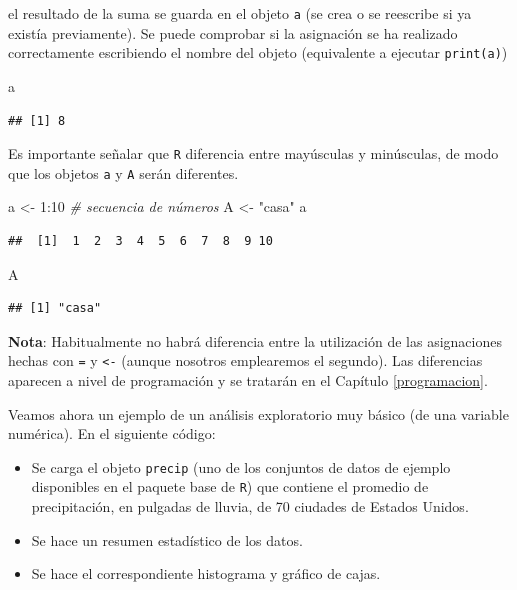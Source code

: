 \documentclass[
]{book}
\newenvironment{Shaded}{\begin{snugshade}}{\end{snugshade}}
\newcommand{\CommentTok}[1]{\textcolor[rgb]{0.56,0.35,0.01}{\textit{#1}}}
\newcommand{\DecValTok}[1]{\textcolor[rgb]{0.00,0.00,0.81}{#1}}
\newcommand{\NormalTok}[1]{#1}
\newcommand{\OtherTok}[1]{\textcolor[rgb]{0.56,0.35,0.01}{#1}}
\newcommand{\SpecialCharTok}[1]{\textcolor[rgb]{0.00,0.00,0.00}{#1}}
\newcommand{\StringTok}[1]{\textcolor[rgb]{0.31,0.60,0.02}{#1}}
\theoremstyle{break}
\theoremstyle{nonumberplain}
\begin{document}
el resultado de la suma se guarda en el objeto \texttt{a} (se crea o se reescribe si ya existía previamente).
Se puede comprobar si la asignación se ha realizado correctamente escribiendo el nombre del objeto (equivalente a ejecutar \texttt{print(a)})

\begin{Shaded}
\begin{Highlighting}[]
\NormalTok{a}
\end{Highlighting}
\end{Shaded}

\begin{verbatim}
## [1] 8
\end{verbatim}

Es importante señalar que \texttt{R} diferencia entre mayúsculas y
minúsculas, de modo que los objetos \texttt{a} y \texttt{A} serán diferentes.

\begin{Shaded}
\begin{Highlighting}[]
\NormalTok{a }\OtherTok{\textless{}{-}} \DecValTok{1}\SpecialCharTok{:}\DecValTok{10} \CommentTok{\# secuencia de números}
\NormalTok{A }\OtherTok{\textless{}{-}} \StringTok{"casa"}
\NormalTok{a}
\end{Highlighting}
\end{Shaded}

\begin{verbatim}
##  [1]  1  2  3  4  5  6  7  8  9 10
\end{verbatim}

\begin{Shaded}
\begin{Highlighting}[]
\NormalTok{A}
\end{Highlighting}
\end{Shaded}

\begin{verbatim}
## [1] "casa"
\end{verbatim}

\textbf{Nota}: Habitualmente no habrá diferencia entre la utilización de las asignaciones hechas con \texttt{=} y \texttt{\textless{}-} (aunque nosotros emplearemos el segundo).
Las diferencias aparecen a nivel de programación y se tratarán en el Capítulo \ref{programacion}.

Veamos ahora un ejemplo de un análisis exploratorio muy básico (de una variable numérica).
En el siguiente código:

\begin{itemize}
\item
  Se carga el objeto \texttt{precip} (uno de los conjuntos de datos de ejemplo disponibles en el paquete base de \texttt{R}) que contiene el promedio de precipitación, en pulgadas de lluvia, de 70 ciudades de Estados Unidos.
\item
  Se hace un resumen estadístico de los datos.
\item
  Se hace el correspondiente histograma y gráfico de cajas.
\end{itemize}
\end{document}
